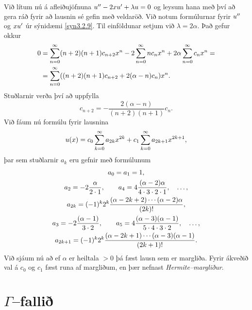 \begin{sy}  
Við lítum nú á afleiðujöfnuna $u{\sp{\prime\prime}}-2xu{\sp{\prime}}+\lambda u=0$ og
leysum hana  með því að gera ráð fyrir að lausnin sé gefin með
veldaröð. Við notum formúlurnar fyrir $u{\sp{\prime\prime}}$ og $xu{\sp{\prime}}$ úr
sýnidæmi \ref{syn3.2.9}.  Til einföldunar setjum við $\lambda=2\alpha$. Það
gefur okkur 
\begin{align*}
0&=
\sum\limits_{n=0}\sp\infty (n+2)(n+1)c_{n+2}x\sp n
-2\sum\limits_{n=0}\sp\infty nc_nx\sp n+
2\alpha\sum\limits_{n=0}\sp\infty c_nx\sp n=
\\
&=\sum\limits_{n=0}\sp\infty
((n+2)(n+1)c_{n+2} +2(\alpha-n)c_n)x\sp n.
\end{align*}
Stuðlarnir verða því að uppfylla
$$
c_{n+2}=- \dfrac{2(\alpha-n)}{(n+2)(n+1)}c_n.
$$
Við fáum nú formúlu fyrir lausnina
$$
u(x) = c_0\sum\limits_{k=0}\sp\infty
a_{2k}
x\sp{2k}
+
c_1\sum\limits_{k=0}\sp\infty
a_{2k+1}
x\sp {2k+1},
$$
þar sem stuðlarnir $a_k$ eru gefnir með formúlunum
\begin{gather*}
a_0=a_1=1,\\
a_2=-2\dfrac{\alpha}{2\cdot 1}, \qquad
a_4=4\dfrac{(\alpha-2)\alpha}{4\cdot 3\cdot 2\cdot 1},  \quad\dots,
\\
a_{2k}=(-1)\sp k 2\sp k \dfrac{(\alpha-2k+2)\cdots(\alpha-2)\alpha}{(2k)!},\\
a_3=-2\dfrac{(\alpha-1)}{3\cdot 2}, \qquad
a_5=4\dfrac{(\alpha-3)(\alpha-1)}{5\cdot 4\cdot 3\cdot 2},  \quad\dots,\\
a_{2k+1}= (-1)\sp k 2\sp k
\dfrac{(\alpha-2k+1)\cdots(\alpha-3)(\alpha-1)}{(2k+1)!}.
\end{gather*}
Við sjáum nú að ef $\alpha$ er heiltala $>0$ þá fæst lausn sem er
margliða.   Fyrir ákveðið val á  $c_0$ og $c_1$ fæst runa af margliðum,
en þær nefnast {\it
Hermite--margliður}.
\end{sy}


\section{$\Gamma$--fallið}  

